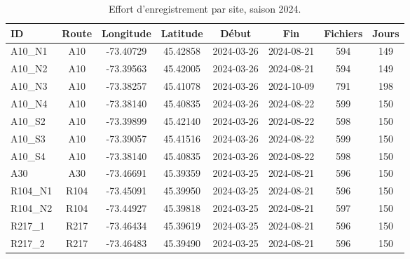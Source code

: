\begin{table}[H]
\centering
\caption{Effort d'enregistrement par site, saison 2024.} 
\label{tab:audio_2024}
\begin{tabular}{lccccccc}
  \toprule
ID & Route & Longitude & Latitude & Début & Fin & Fichiers & Jours  \\ 
  \midrule
A10\_N1 & A10 & -73.40729 & 45.42858 & 2024-03-26 & 2024-08-21 & 594 & 149  \\ 
  A10\_N2 & A10 & -73.39563 & 45.42005 & 2024-03-26 & 2024-08-21 & 594 & 149  \\ 
  A10\_N3 & A10 & -73.38257 & 45.41078 & 2024-03-26 & 2024-10-09 & 791 & 198  \\ 
  A10\_N4 & A10 & -73.38140 & 45.40835 & 2024-03-26 & 2024-08-22 & 599 & 150  \\ 
  A10\_S2 & A10 & -73.39899 & 45.42140 & 2024-03-26 & 2024-08-22 & 598 & 150  \\ 
  A10\_S3 & A10 & -73.39057 & 45.41516 & 2024-03-26 & 2024-08-22 & 599 & 150  \\ 
  A10\_S4 & A10 & -73.38140 & 45.40835 & 2024-03-26 & 2024-08-22 & 598 & 150  \\ 
  A30 & A30 & -73.46691 & 45.39359 & 2024-03-25 & 2024-08-21 & 596 & 150  \\ 
  R104\_N1 & R104 & -73.45091 & 45.39950 & 2024-03-25 & 2024-08-21 & 596 & 150  \\ 
  R104\_N2 & R104 & -73.44927 & 45.39818 & 2024-03-25 & 2024-08-21 & 597 & 150  \\ 
  R217\_1 & R217 & -73.46434 & 45.39619 &  2024-03-25 & 2024-08-21 & 596 & 150 \\ 
  R217\_2 & R217 & -73.46483 & 45.39490 & 2024-03-25 & 2024-08-21 & 596 & 150  \\ 
   \bottomrule
\end{tabular}
\end{table}



